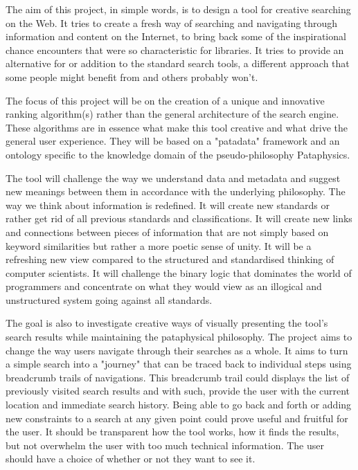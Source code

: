 The aim of this project, in simple words, is to design a tool for creative searching on the Web. It tries to create a fresh way of searching and navigating through information and content on the Internet, to bring back some of the inspirational chance encounters that were so characteristic for libraries. It tries to provide an alternative for or addition to the standard search tools, a different approach that some people might benefit from and others probably won't.

The focus of this project will be on the creation of a unique and innovative ranking algorithm(s) rather than the general architecture of the search engine. These algorithms are in essence what make this tool creative and what drive the general user experience. They will be based on a "patadata" framework and an ontology specific to the knowledge domain of the pseudo-philosophy Pataphysics.

The tool will challenge the way we understand data and metadata and suggest new meanings between them in accordance with the underlying philosophy. The way we think about information is redefined. It will create new standards or rather get rid of all previous standards and classifications. It will create new links and connections between pieces of information that are not simply based on keyword similarities but rather a more poetic sense of unity. It will be a refreshing new view compared to the structured and standardised thinking of computer scientists. It will challenge the binary logic that dominates the world of programmers and concentrate on what they would view as an illogical and unstructured system going against all standards.

The goal is also to investigate creative ways of visually presenting the tool's search results while maintaining the pataphysical philosophy. The project aims to change the way users navigate through their searches as a whole. It aims to turn a simple search into a "journey" that can be traced back to individual steps using breadcrumb trails of navigations. This breadcrumb trail could displays the list of previously visited search results and with such, provide the user with the current location and immediate search history. Being able to go back and forth or adding new constraints to a search at any given point could prove useful and fruitful for the user. It should be transparent how the tool works, how it finds the results, but not overwhelm the user with too much technical information. The user should have a choice of whether or not they want to see it.


